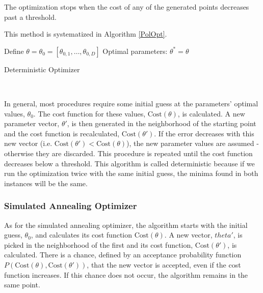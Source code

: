 The optimization stops when the cost of any of the generated points decreases past a threshold.

This method is systematized in Algorithm \ref{PolOpt}.

\begin{algorithm}[H]\label{PolOpt}
\DontPrintSemicolon
 Define $\theta=\theta_0=\left[\theta_{0,1},\ldots,\theta_{0,D}\right]$
 Optimal parameters: $\theta^{*}=\theta$\;
 \caption{Deterministic Optimizer}
\end{algorithm}
\ 



In general, most procedures require some initial guess at the parameters' optimal values, $\theta_0$. The cost function for these values, $\mathrm{Cost}(\theta)$, is calculated. A new parameter vector, $\theta'$, is then generated in the neighborhood of the starting point and the cost function is recalculated, $\mathrm{Cost}(\theta')$. If the error decreases with this new vector (i.e. $\mathrm{Cost}(\theta')<\mathrm{Cost}(\theta)$), the new parameter values are assumed - otherwise they are discarded. This procedure is repeated until the cost function decreases below a threshold.
This algorithm is called deterministic because if we run the optimization twice with the same initial guess, the minima found in both instances will be the same.










\subsubsection{Simulated Annealing Optimizer}
As for the simulated annealing optimizer, the algorithm  starts with the initial guess, $\theta_0$, and calculates its cost function $\mathrm{Cost}(\theta)$. A new vector, $theta'$, is picked in the neighborhood of the first and its cost function, $\mathrm{Cost}(\theta')$, is calculated. 
There is a chance, defined by an acceptance probability function $P(\mathrm{Cost}(\theta),\mathrm{Cost}(\theta'))$, that the new vector is accepted, even if the cost function increases.
If this chance does not occur, the algorithm remains in the same point. 

